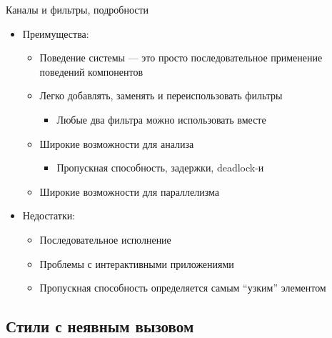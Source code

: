 \documentclass{../../slides-style}
\begin{document}
    \begin{frame}{Каналы и фильтры, подробности}
        \begin{itemize}
            \item Преимущества:
            \begin{itemize}
                \item Поведение системы --- это просто последовательное применение поведений компонентов
                \item Легко добавлять, заменять и переиспользовать фильтры
                \begin{itemize}
                    \item Любые два фильтра можно использовать вместе
                \end{itemize}
                \item Широкие возможности для анализа
                \begin{itemize}
                    \item Пропускная способность, задержки, deadlock-и
                \end{itemize}
                \item Широкие возможности для параллелизма
            \end{itemize}
            \item Недостатки:
            \begin{itemize}
                \item Последовательное исполнение
                \item Проблемы с интерактивными приложениями
                \item Пропускная способность определяется самым \enquote{узким} элементом
            \end{itemize}
        \end{itemize}
    \end{frame}

    \subsection{Стили с неявным вызовом}
\end{document}
